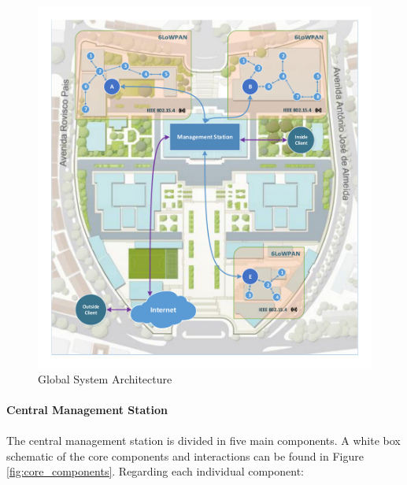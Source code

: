 \begin{figure}[h]
  \centering
  \includegraphics[width=0.9\linewidth]{figures/Global_Architecture.pdf}
  \caption{Global System Architecture}
  \label{fig:global_architecture}
\end{figure}

\paragraph{\textbf{Central Management Station}}
\paragraph{}

The central management station is divided in five main components. A white box schematic of the core components and interactions can be found in Figure \ref{fig:core_components}. Regarding each individual component:

